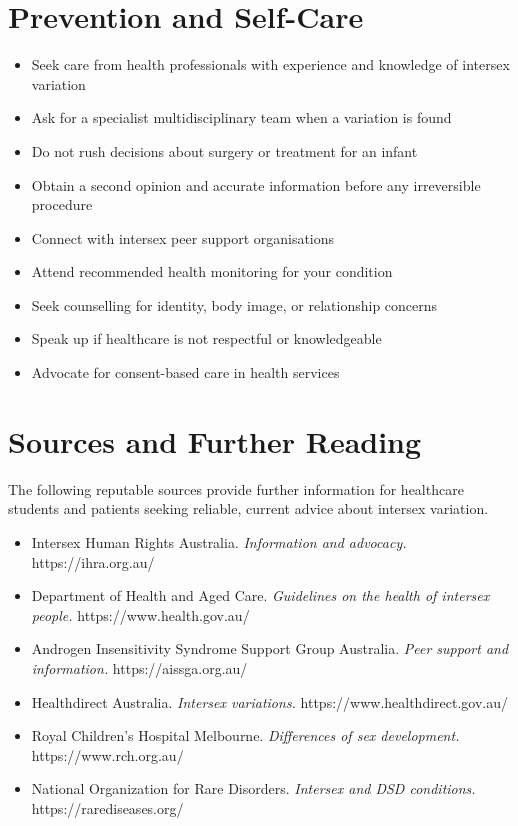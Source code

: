 \section*{Prevention and Self-Care}
\begin{itemize}
    \item Seek care from health professionals with experience and knowledge of intersex variation
    \item Ask for a specialist multidisciplinary team when a variation is found
    \item Do not rush decisions about surgery or treatment for an infant
    \item Obtain a second opinion and accurate information before any irreversible procedure
    \item Connect with intersex peer support organisations
    \item Attend recommended health monitoring for your condition
    \item Seek counselling for identity, body image, or relationship concerns
    \item Speak up if healthcare is not respectful or knowledgeable
    \item Advocate for consent-based care in health services
\end{itemize}

\section*{Sources and Further Reading}
The following reputable sources provide further information for healthcare students and patients seeking reliable, current advice about intersex variation.
\begin{itemize}
    \item Intersex Human Rights Australia. \textit{Information and advocacy.} https://ihra.org.au/
    \item Department of Health and Aged Care. \textit{Guidelines on the health of intersex people.} https://www.health.gov.au/
    \item Androgen Insensitivity Syndrome Support Group Australia. \textit{Peer support and information.} https://aissga.org.au/
    \item Healthdirect Australia. \textit{Intersex variations.} https://www.healthdirect.gov.au/
    \item Royal Children's Hospital Melbourne. \textit{Differences of sex development.} https://www.rch.org.au/
    \item National Organization for Rare Disorders. \textit{Intersex and DSD conditions.} https://rarediseases.org/
\end{itemize}
